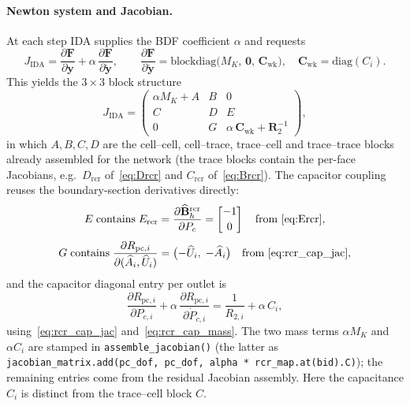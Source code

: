 \documentclass[11pt]{article}
\begin{document}
\paragraph{Newton system and Jacobian.}
At each step IDA supplies the BDF coefficient $\alpha$ and requests
\begin{equation}
  J_{\mathrm{IDA}}
  =\frac{\partial\mathbf F}{\partial\mathbf y}
   +\alpha\,\frac{\partial\mathbf F}{\partial\dot{\mathbf y}},
  \qquad
  \frac{\partial\mathbf F}{\partial\dot{\mathbf y}}
  =\mathrm{blockdiag}\bigl(M_K,\,\mathbf 0,\,\mathbf C_{\mathrm{wk}}\bigr),
  \quad
  \mathbf C_{\mathrm{wk}}=\mathrm{diag}(C_i).
  \label{eq:ida_J}
\end{equation}
This yields the $3\times3$ block structure
\begin{equation}
  J_{\mathrm{IDA}}
  =
  \begin{pmatrix}
  \alpha M_K + A & B & 0\\[4pt]
  C & D & E\\[4pt]
  0 & G & \alpha\,\mathbf C_{\mathrm{wk}}+\mathbf R_2^{-1}
  \end{pmatrix},
  \label{eq:ida_Jblocks}
\end{equation}
in which $A,B,C,D$ are the cell--cell, cell--trace, trace--cell and
trace--trace blocks already assembled for the network (the trace blocks contain
the per-face Jacobians, e.g.\ $D_{\mathrm{rcr}}$ of~\eqref{eq:Drcr} and
$C_{\mathrm{rcr}}$ of~\eqref{eq:Brcr}). The capacitor coupling reuses the
boundary-section derivatives directly:
\begin{equation}
  E \;\text{contains}\; E_{\mathrm{rcr}}
  =\frac{\partial\widehat{\mathbf B}_h^{\mathrm{rcr}}}{\partial P_c}
  =\begin{bmatrix}-1\\[2pt]0\end{bmatrix}
  \quad\text{from~\eqref{eq:Ercr}},
  \label{eq:ida_E}
\end{equation}
\begin{equation}
  G \;\text{contains}\;
  \frac{\partial R_{\mathrm{pc},i}}{\partial(\widehat A_i,\widehat U_i)}
  =\bigl(-\widehat U_i,\;-\widehat A_i\bigr)
  \quad\text{from~\eqref{eq:rcr_cap_jac}},
  \label{eq:ida_G}
\end{equation}
and the capacitor diagonal entry per outlet is
\begin{equation}
  \frac{\partial R_{\mathrm{pc},i}}{\partial P_{c,i}}
  +\alpha\,\frac{\partial R_{\mathrm{pc},i}}{\partial\dot P_{c,i}}
  =\frac{1}{R_{2,i}}+\alpha\,C_i ,
  \label{eq:ida_pcdiag}
\end{equation}
using~\eqref{eq:rcr_cap_jac} and~\eqref{eq:rcr_cap_mass}. The two mass terms
$\alpha M_K$ and $\alpha C_i$ are stamped in \texttt{assemble\_jacobian()}
(the latter as \texttt{jacobian\_matrix.add(pc\_dof, pc\_dof, alpha *
rcr\_map.at(bid).C)}); the remaining entries come from the residual Jacobian
assembly. Here the capacitance $C_i$ is distinct from the trace--cell block
$C$.
\end{document}
